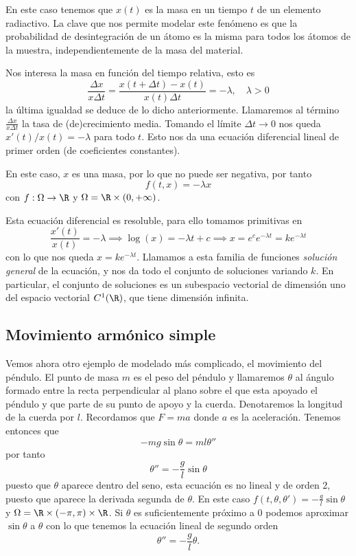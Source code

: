 \documentclass[../main.tex]{subfiles}
\begin{document}
En este caso tenemos que \(x(t)\) es
la masa en un tiempo \(t\) de un elemento radiactivo. La clave que nos permite
modelar este fenómeno es que la probabilidad de desintegración de un átomo es la
misma para todos los átomos de la muestra, independientemente de la masa del
material.

Nos interesa la masa en función del tiempo relativa, esto es
\[\frac{\Delta x}{x \Delta t} = \frac{x(t + \Delta t) - x(t)}{x(t) \Delta t}
  = -\lambda, \quad \lambda > 0\] la última igualdad se deduce de lo dicho
anteriormente. Llamaremos al término \(\frac{\Delta x}{x\Delta t}\) la tasa de
(de)crecimiento media. Tomando el límite \(\Delta t \to 0\) nos queda
\(x'(t)/x(t) = -\lambda\) para todo \(t\). Esto nos da una ecuación diferencial
lineal de primer orden (de coeficientes constantes).

En este caso, \(x\) es una masa, por lo que no puede ser negativa, por tanto
\[f(t, x) = -\lambda x\]
con \(f : \Omega \to \R\) y \(\Omega = \R \times (0, +\infty)\).

Esta ecuación diferencial es resoluble, para ello tomamos primitivas en
\[\frac{x'(t)}{x(t)} = -\lambda \implies \log(x) = -\lambda t + c
  \implies x = e^c e^{-\lambda t} = k e^{-\lambda t}\] con lo que nos queda
\(x = k e^{-\lambda t}\). Llamamos a esta familia de funciones \emph{solución general}
de la ecuación, y nos da todo el conjunto de soluciones variando \(k\). En
particular, el conjunto de soluciones es un subespacio vectorial de dimensión
uno del espacio vectorial \(C^1(\R)\), que tiene dimensión infinita.

\subsection{Movimiento armónico simple}

Vemos ahora otro ejemplo de modelado más complicado, el movimiento del péndulo.
El punto de masa \(m\) es el peso del péndulo y llamaremos \(\theta\) al ángulo
formado entre la recta perpendicular al plano sobre el que esta apoyado el
péndulo y que parte de su punto de apoyo y la cuerda. Denotaremos la longitud
de la cuerda por \(l\). Recordamos que \(F = ma\) donde \(a\) es la aceleración.
Tenemos entonces que
\[-m g \sin\theta = m l \theta''\]
por tanto
\[\theta'' = -\frac{g}{l} \sin\theta\]
puesto que \(\theta\) aparece dentro del seno, esta ecuación es no lineal y de
orden 2, puesto que aparece la derivada segunda de \(\theta\). En este caso
\(f(t, \theta, \theta') = -\frac{g}{l} \sin\theta\) y \(\Omega = \R \times
(-\pi, \pi) \times \R\). Si \(\theta\) es suficientemente próximo a \(0\)
podemos aproximar \(\sin\theta\) a \(\theta\) con lo que tenemos la ecuación
lineal de segundo orden
\[\theta'' = -\frac{g}{l}\theta.\]
\end{document}
